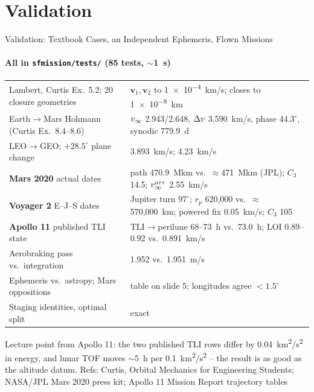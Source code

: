 \documentclass[aspectratio=169,10pt]{beamer}
\newcommand{\code}[1]{\texttt{#1}}
\newcommand{\src}[1]{\vfill\hfill{\tiny\color{gray}#1}}
\begin{document}
\section{Validation}
\begin{frame}{Validation: Textbook Cases, an Independent Ephemeris, Flown Missions}
  \framesubtitle{All in \code{sfmission/tests/} (85 tests, $\sim$1~s)}
\footnotesize
\begin{tabular}{p{}p{}}\toprule
Lambert, Curtis Ex.~5.2; 20 closure geometries & $\bm v_1,\bm v_2$ to \SI{1e-4}{km/s}; closes to \SI{1e-8}{km} \\
Earth$\to$Mars Hohmann (Curtis Ex.~8.4--8.6) & $v_\infty$ 2.943/2.648, $\Delta v$ 3.590~km/s, phase $44.3^\circ$, synodic 779.9~d \\
LEO$\to$GEO; $+28.5^\circ$ plane change & 3.893~km/s; 4.23~km/s \\
\textbf{Mars 2020} actual dates & path \SI{470.9}{Mkm} vs.\ $\approx$\SI{471}{Mkm} (JPL); $C_3$ 14.5; $v_\infty^{arr}$ 2.55~km/s \\
\textbf{Voyager 2} E--J--S dates & Jupiter turn $97^\circ$; $r_p$ 620,000 vs.\ $\approx$570,000~km; powered fix 0.05~km/s; $C_3$ 105 \\
\textbf{Apollo 11} published TLI state & TLI$\to$perilune 68--73~h vs.\ 73.0~h; LOI 0.89--0.92 vs.\ 0.891~km/s \\
Aerobraking pass vs.\ integration & 1.952 vs.\ 1.951~m/s \\
Ephemeris vs.\ astropy; Mars oppositions & table on slide 5; longitudes agree $<1.5^\circ$ \\
Staging identities, optimal split & exact \\\bottomrule
\end{tabular}
\medskip

\small Lecture point from Apollo 11: the two published TLI rows differ by \SI{0.04}{km^2/s^2} in energy, and lunar TOF moves $\sim$\SI{5}{h} per \SI{0.1}{km^2/s^2} -- the result is as good as the altitude datum.
\src{Refs: Curtis, Orbital Mechanics for Engineering Students; NASA/JPL Mars 2020 press kit; Apollo 11 Mission Report trajectory tables}
\end{frame}

\end{document}
